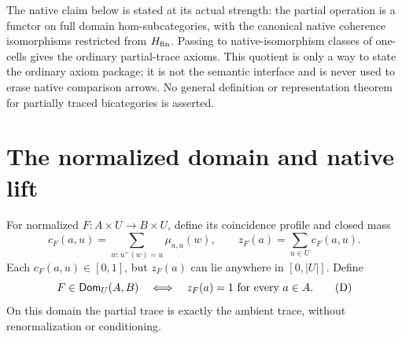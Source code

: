 \documentclass[11pt]{article}
\newcommand{\HM}{H_{\rm fin}}\newcommand{\HP}{H_{\rm prob}}
\begin{document}
The native claim below is stated at its actual strength: the partial operation is a functor on full domain hom-subcategories, with the canonical native coherence isomorphisms restricted from $\HM$. Passing to native-isomorphism classes of one-cells gives the ordinary partial-trace axioms. This quotient is only a way to state the ordinary axiom package; it is not the semantic interface and is never used to erase native comparison arrows. No general definition or representation theorem for partially traced bicategories is asserted.

\section{The normalized domain and native lift}
For normalized $F:A\times U\to B\times U$, define its coincidence profile and closed mass
\[
 c_F(a,u)=\sum_{w:u^+(w)=u}\mu_{a,u}(w),\qquad
 z_F(a)=\sum_{u\in U}c_F(a,u).
\]
Each $c_F(a,u)\in[0,1]$, but $z_F(a)$ can lie anywhere in $[0,|U|]$. Define
\[
 F\in\mathsf{Dom}_U(A,B)\quad\Longleftrightarrow\quad
 z_F(a)=1\ \hbox{for every }a\in A.
 \tag{D}
\]
On this domain the partial trace is exactly the ambient trace, without renormalization or conditioning.
\end{document}
